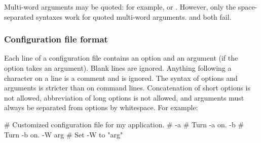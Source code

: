 Multi-word arguments may be quoted: for example,  or . However, only the space-separated
syntaxes work for quoted multi-word arguments.  and  both fail.

   \subsubsection{Configuration file format}

Each line of a configuration file contains an option and an argument
(if the option takes an argument). Blank lines are ignored.  Anything
following a \ccode{\#} character on a line is a comment and is
ignored. The syntax of options and arguments is stricter than on
command lines.  Concatenation of short options is not allowed,
abbreviation of long options is not allowed, and arguments must always
be separated from options by whitespace. For example:

\begin{cchunk}
   # Customized configuration file for my application.
   #
   -a             # Turn -a on.
   -b             # Turn -b on.
   -W arg         # Set -W to "arg"
\end{cchunk}





